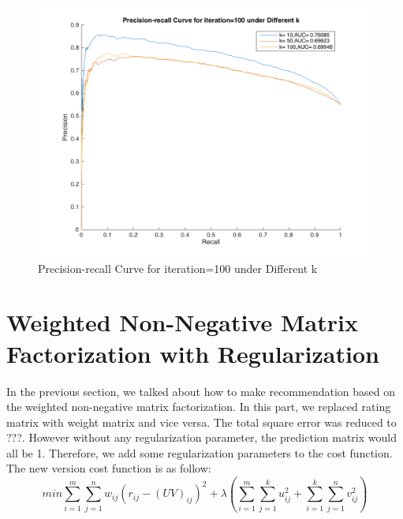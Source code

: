 \documentclass{article}
\begin{document}
\begin{figure}[htbp]
\centering
\includegraphics[width=\textwidth]{problem32.png}
\caption{Precision-recall Curve for iteration=100 under Different k}
\label{fig:problem32}
\end{figure}
\section{Weighted Non-Negative Matrix Factorization with Regularization}
In the previous section, we talked about how to make recommendation based on the weighted non-negative matrix factorization. In this part, we replaced rating matrix with weight matrix and vice versa. The total square error was reduced to ???. However without any regularization parameter, the prediction matrix would all be 1. Therefore, we add some regularization parameters to the cost function. The new version cost function is as follow:
\begin{equation*}
min\sum_{i=1}^{m}\sum_{j=1}^{n}w_{ij}{(r_{ij}-{(UV)}_{ij})}^2 + \lambda\left( \sum_{i=1}^m\sum_{j=1}^ku_{ij}^2+\sum_{i=1}^k\sum_{j=1}^nv_{ij}^2\right) 
\end{equation*}
\end{document}
